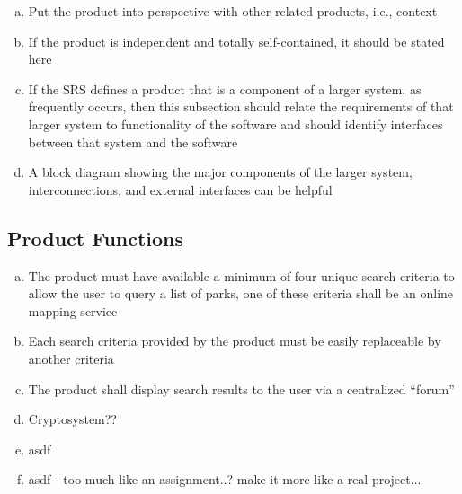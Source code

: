 \documentclass[]{article}
\begin{document}
\color{red}
\begin{enumerate}[a)]
	\item Put the product into perspective with other related products, i.e., context
	\item If the product is independent and totally self-contained, it should be stated here
    \item If the SRS defines a product that is a component of a larger system, as frequently occurs,
    then this subsection should relate the requirements of that larger system to functionality of
    the software and should identify interfaces between that system and the software
	\item A block diagram showing the major components of the larger system, interconnections, and
	external interfaces can be helpful
\end{enumerate}
\color{black}

\subsection{Product Functions}%
\label{sub:product_functions}
\begin{enumerate}[a)]
    \item The product must have available a minimum of four unique search criteria to allow the user
	to query a list of parks, one of these criteria shall be an online mapping service
    \item Each search criteria provided by the product must be easily replaceable by another
    criteria
	\item The product shall display search results to the user via a centralized ``forum''
	\item Cryptosystem??
	\item asdf
	\item asdf - too much like an assignment..? make it more like a real project...
\end{enumerate}
\end{document}
